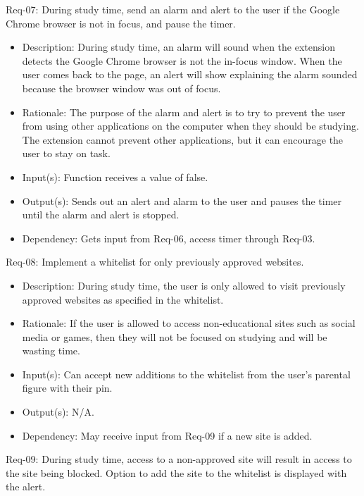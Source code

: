 \documentclass[12pt]{article}
\begin{document}
Req-07: During study time, send an alarm and alert to the user if the Google Chrome browser is not in focus, and pause the timer.
\begin{itemize}
    \item Description: During study time, an alarm will sound when the extension detects the Google Chrome browser is not the in-focus window. When the user comes back to the page, an alert will show explaining the alarm sounded because the browser window was out of focus.
    \item Rationale: The purpose of the alarm and alert is to try to prevent the user from using other applications on the computer when they should be studying. The extension cannot prevent other applications, but it can encourage the user to stay on task.
    \item Input(s): Function receives a value of false.
    \item Output(s): Sends out an alert and alarm to the user and pauses the timer until the alarm and alert is stopped.
    \item Dependency: Gets input from Req-06, access timer through Req-03.
\end{itemize}
Req-08: Implement a whitelist for only previously approved websites.
\begin{itemize}
    \item Description: During study time, the user is only allowed to visit previously approved websites as specified in the whitelist.
    \item Rationale: If the user is allowed to access non-educational sites such as social media or games, then they will not be focused on studying and will be wasting time. 
    \item Input(s): Can accept new additions to the whitelist from the user’s parental figure with their pin.
    \item Output(s): N/A.
    \item Dependency: May receive input from Req-09 if a new site is added.
\end{itemize}
Req-09: During study time, access to a non-approved site will result in access to the site being blocked. Option to add the site to the whitelist is displayed with the alert.
\end{document}
